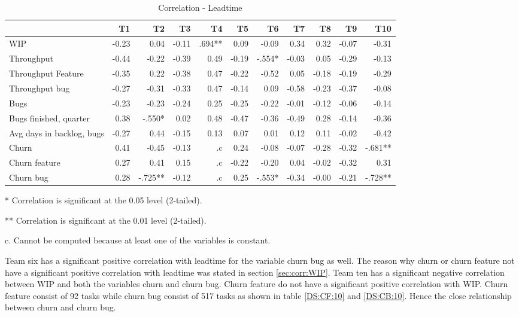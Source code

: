 \documentclass[UKenglish]{ifimaster}  %
\begin{document}
\begin{table}[!htbp]
 \begin{adjustwidth}{-2.5cm}{}
 \centering
 \begin{tabular}{|l|r|r|r|r|r|r|r|r|r|r|}
\hline
  & T1 & T2 & T3 & T4 & T5 & T6 & T7 & T8 & T9 & T10\\ \hline
WIP &-0.23& 0.04& -0.11& .694**& 0.09& -0.09& 0.34& 0.32& -0.07& -0.31\\ \hline
Throughput &-0.44& -0.22& -0.39& 0.49& -0.19& -.554*& -0.03& 0.05& -0.29& -0.13\\ \hline
Throughput Feature &-0.35& 0.22& -0.38& 0.47& -0.22& -0.52& 0.05& -0.18& -0.19& -0.29\\ \hline
Throughput bug &-0.27& -0.31& -0.33& 0.47& -0.14& 0.09& -0.58& -0.23& -0.37& -0.08\\ \hline
Bugs &-0.23& -0.23& -0.24& 0.25& -0.25& -0.22& -0.01& -0.12& -0.06& -0.14\\ \hline
Bugs finished, quarter &0.38& -.550*& 0.02& 0.48& -0.47& -0.36& -0.49& 0.28& -0.14& -0.36\\ \hline
Avg days in backlog, bugs &-0.27& 0.44& -0.15& 0.13& 0.07& 0.01& 0.12& 0.11& -0.02& -0.42\\ \hline
Churn &0.41& -0.45& -0.13& .c& 0.24& -0.08& -0.07& -0.28& -0.32& -.681**\\ \hline
Churn feature &0.27& 0.41& 0.15& .c& -0.22& -0.20& 0.04& -0.02& -0.32& 0.31\\ \hline
Churn bug &0.28& -.725**
& -0.12& .c
& 0.25& -.553*
& -0.34& -0.00& -0.21& -.728**
\\ \hline
\end{tabular}
 \caption{Correlation - Leadtime}
 \label{corr:Leadtime}
 \centerline {* Correlation is significant at the 0.05 level (2-tailed).}
\centerline{** Correlation is significant at the 0.01 level (2-tailed).}
\centerline{c. Cannot be computed because at least one of the variables is constant.}
\end{adjustwidth}
\end{table}
Team six has a significant positive correlation with leadtime for the variable churn bug as well. The reason why churn or churn 
feature not have a significant positive correlation with leadtime was stated in section \ref{sec:corr:WIP}. Team ten has a significant negative correlation between WIP and both the variables churn and churn bug. Churn feature do not have a significant positive correlation with WIP. Churn feature consist of 92 tasks while churn bug consist of 517 tasks as shown in table \ref{DS:CF:10} and \ref{DS:CB:10}. Hence the close relationship between churn and churn bug. 
\end{document}
